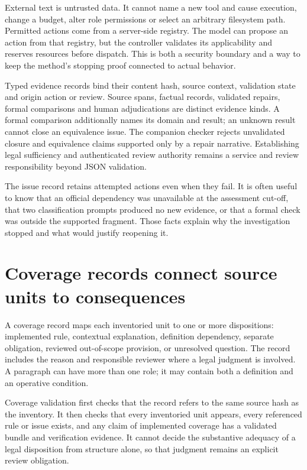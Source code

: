 
External text is untrusted data. It cannot name a new tool and cause execution,
change a budget, alter role permissions or select an arbitrary filesystem path.
Permitted actions come from a server-side registry. The model can propose an
action from that registry, but the controller validates its applicability and
reserves resources before dispatch. This is both a security boundary and a way to
keep the method's stopping proof connected to actual behavior.

Typed evidence records bind their content hash, source context, validation state
and origin action or review. Source spans, factual records, validated repairs,
formal comparisons and human adjudications are distinct evidence kinds. A formal
comparison additionally names its domain and result; an unknown result cannot
close an equivalence issue. The companion checker rejects unvalidated closure
and equivalence claims supported only by a repair narrative. Establishing legal
sufficiency and authenticated review authority remains a service and review
responsibility beyond JSON validation.

The issue record retains attempted actions even when they fail. It is often useful
to know that an official dependency was unavailable at the assessment cut-off,
that two classification prompts produced no new evidence, or that a formal check
was outside the supported fragment. Those facts explain why the investigation
stopped and what would justify reopening it.

\section{Coverage records connect source units to consequences}
\label{merge:M08:05}


A coverage record maps each inventoried unit to one or more dispositions:
implemented rule, contextual explanation, definition dependency, separate
obligation, reviewed out-of-scope provision, or unresolved question. The record
includes the reason and responsible reviewer where a legal judgment is involved.
A paragraph can have more than one role; it may contain both a definition and an
operative condition.

Coverage validation first checks that the record refers to the same source hash
as the inventory. It then checks that every inventoried unit appears, every
referenced rule or issue exists, and any claim of implemented coverage has a
validated bundle and verification evidence. It cannot decide the substantive
adequacy of a legal disposition from structure alone, so that judgment remains
an explicit review obligation.

